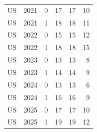 \begin{tabular}{lrrrrr}
US & 2021 & 0 & 17 & 17 & 10 \\
US & 2021 & 1 & 18 & 18 & 11 \\
US & 2022 & 0 & 15 & 15 & 12 \\
US & 2022 & 1 & 18 & 18 & 15 \\
US & 2023 & 0 & 13 & 13 & 8 \\
US & 2023 & 1 & 14 & 14 & 9 \\
US & 2024 & 0 & 13 & 13 & 6 \\
US & 2024 & 1 & 16 & 16 & 9 \\
US & 2025 & 0 & 17 & 17 & 10 \\
US & 2025 & 1 & 19 & 19 & 12 \\
\bottomrule
\end{tabular}

